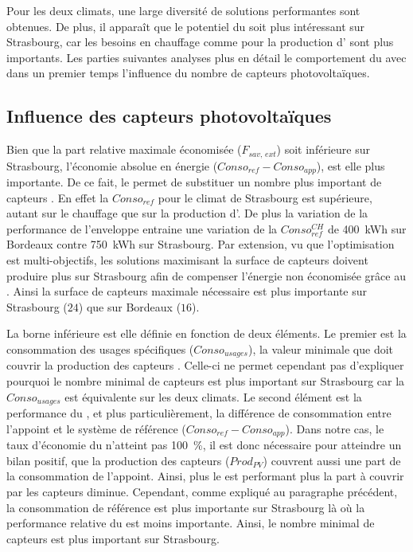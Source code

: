 Pour les deux climats, une large diversité de solutions performantes sont obtenues.
De plus, il apparaît que le potentiel du  soit plus intéressant sur Strasbourg,
car les besoins en chauffage comme pour la production d’ sont plus importants.
Les parties suivantes analyses plus en détail le comportement du  avec dans un
premier temps l’influence du nombre de capteurs photovoltaïques.



\subsection{Influence des capteurs photovoltaïques} %
\label{sub:influence_des_capteurs_photovoltaiques}
Bien que la part relative maximale économisée ($F_{sav,\,ext}$) soit inférieure sur
Strasbourg, l’économie absolue en énergie ($Conso_{ref} - Conso_{app}$), est elle plus
importante. De ce fait, le  permet de substituer un nombre plus important de
capteurs . En effet la $Conso_{ref}$ pour le climat de Strasbourg est supérieure,
autant sur le chauffage que sur la production d’. De plus la variation de la
performance de l’enveloppe entraine une variation de la $Conso_{ref}^{CH}$ de
\SI{400}{kWh} sur Bordeaux contre \SI{750}{kWh} sur Strasbourg. Par extension, vu que
l’optimisation est multi-objectifs, les solutions maximisant la surface de capteurs
 doivent produire plus sur Strasbourg afin de compenser l’énergie non économisée
grâce au . Ainsi la surface de capteurs  maximale nécessaire est plus
importante sur Strasbourg ($24$) que sur Bordeaux ($16$).

La borne inférieure est elle définie en fonction de deux éléments. Le premier est la
consommation des usages spécifiques ($Conso_{usages}$), la valeur minimale que doit
couvrir la production des capteurs . Celle-ci ne permet cependant pas d’expliquer
pourquoi le nombre minimal de capteurs  est plus important sur Strasbourg car la
$Conso_{usages}$ est équivalente sur les deux climats. Le second élément est la
performance du , et plus particulièrement, la différence de consommation entre
l’appoint et le système de référence ($Conso_{ref} - Conso_{app}$). Dans notre cas, le
taux d’économie du  n’atteint pas \SI{100}{\percent}, il est donc nécessaire pour
atteindre un bilan positif, que la production des capteurs  ($Prod_{PV}$) couvrent
aussi une part de la consommation de l’appoint. Ainsi, plus le  est performant
plus la part à couvrir par les capteurs  diminue. Cependant, comme expliqué au
paragraphe précédent, la consommation de référence est plus importante sur Strasbourg là
où la performance relative du  est moins importante. Ainsi, le nombre minimal de
capteurs  est plus important sur Strasbourg.


